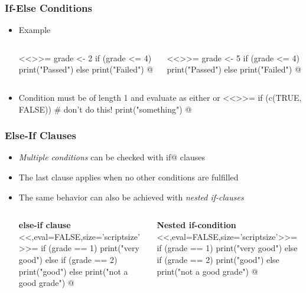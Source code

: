 \documentclass[%
  final,
  11pt, 
  show notes, %
  t, %
  fleqn, %
]{beamer}
\begin{document}
\begin{frame}[fragile]
  \frametitle{If-Else Conditions}
\begin{itemize}
\item Example
\begin{columns}[T]
\begin{column}{.35\textwidth}
<<>>=
grade <- 2
if (grade <= 4) {
  print("Passed")
} else {
  print("Failed")
}
@
\end{column}
\begin{column}{.35\textwidth}
<<>>=
grade <- 5
if (grade <= 4) {
  print("Passed")
} else {
  print("Failed")
}
@
\end{column}
\end{columns}	
\item Condition must be of length 1 and evaluate as either \verb@TRUE@ or \verb@FALSE@
<<>>=
if (c(TRUE, FALSE)) { # don't do this!
  print("something")
}
@
\end{itemize}
\end{frame}

\begin{frame}[fragile]
  \frametitle{Else-If Clauses}
\begin{itemize}
\item \emph{Multiple conditions} can be checked with \verb@else if@ clauses
\item The last \verb@else@ clause applies when no other conditions are fulfilled
\item The same behavior can also be achieved with \emph{nested if-clauses}
\begin{columns}[T]
\begin{column}{.4\textwidth}
\textbf{else-if clause}\\
<<,eval=FALSE,size='scriptsize'>>=
if (grade == 1) {
  print("very good")
} else if (grade == 2) {
  print("good")
} else {
  print("not a good grade")
}
@
\end{column}
\begin{column}{.4\textwidth}
\textbf{Nested if-condition}
<<,eval=FALSE,size='scriptsize'>>=
if (grade == 1) {
  print("very good")
} else {
  if (grade == 2) {
    print("good")
  } else {
    print("not a good grade")
  }
}
@
\end{column}
\end{columns}	
\end{itemize}
\end{frame}
\end{document}

